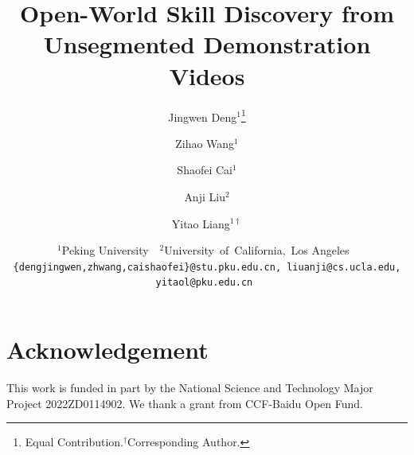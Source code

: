 \documentclass[10pt,twocolumn,letterpaper]{article}
\title{Open-World Skill Discovery from Unsegmented Demonstration Videos}
\author{
Jingwen Deng$^{1}$\thanks{Equal Contribution.\quad$^{\dagger}$Corresponding Author.}
\and 
Zihao Wang$^{1}$\footnotemark[1]
\and 
Shaofei Cai$^1$ 
\and
Anji Liu$^2$ 
\and
Yitao Liang$^{1\dagger}$
\and
\small{$^1$Peking University~\,
$^2$University~of~California,~Los Angeles~\,}
\\
\tt{\small{\{dengjingwen,zhwang,caishaofei\}@stu.pku.edu.cn, liuanji@cs.ucla.edu, yitaol@pku.edu.cn}}
}
\begin{document}
\maketitle
\renewcommand{\thefootnote}{}
\renewcommand{\thefootnote}{\arabic{footnote}}
\begin{abstract}
    
\end{abstract}



\section*{Acknowledgement}

This work is funded in part by the National Science and Technology Major Project 2022ZD0114902.
We thank a grant from CCF-Baidu Open Fund.
{
    \small
    
    
}

\clearpage
\maketitlesupplementary
\appendix

\end{document}
